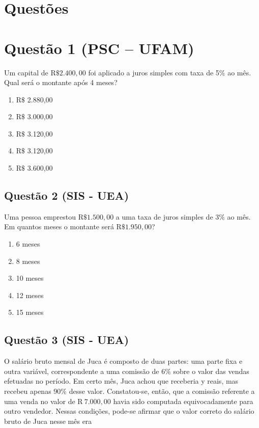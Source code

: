 \documentclass{article}
\begin{document}
	\begin{multicols}{2}
		\columnseprule=0.4pt
		\columnsep=20pt
		
	\section*{Questões}
		
        
        \section*{Questão 1 (PSC – UFAM)}
		Um capital de R$\$ 2.400,00$ foi aplicado a juros simples com taxa de 5$\%$ ao mês. Qual será o montante após 4 meses? 
		
		\begin{enumerate}[label=(\Alph*), noitemsep]
			\item R$\$$ 2.880,00 %
			\item R$\$$ 3.000,00
			\item R$\$$ 3.120,00
			\item R$\$$ 3.120,00
			\item R$\$$ 3.600,00
		\end{enumerate}
        
		\subsection*{Questão 2 (SIS - UEA)}
		
		Uma pessoa emprestou R$\$ 1.500,00$ a uma taxa de juros simples de 3$\%$ ao mês. Em quantos meses o montante será R$\$ 1.950,00$?
		\begin{enumerate}[label=(\Alph*), noitemsep]
			\item 6 meses
			\item 8 meses 
			\item 10 meses %
			\item 12 meses
			\item 15 meses
		\end{enumerate}
		
	
        \subsection*{Questão 3 (SIS - UEA)}
         O salário bruto mensal de Juca é composto de duas partes: uma parte fixa e outra variável, correspondente a uma comissão de 6$\%$ sobre o valor das vendas efetuadas no período. Em certo mês, Juca achou que receberia y reais, mas recebeu apenas 90$\%$ desse valor. Constatou-se, então, que a comissão referente a uma venda no valor de R$\ 7.000,00$ havia sido computada equivocadamente para outro vendedor. Nessas condições, pode-se afirmar que o valor correto do salário bruto de Juca nesse mês era
		

\end{multicols}
\end{document}
